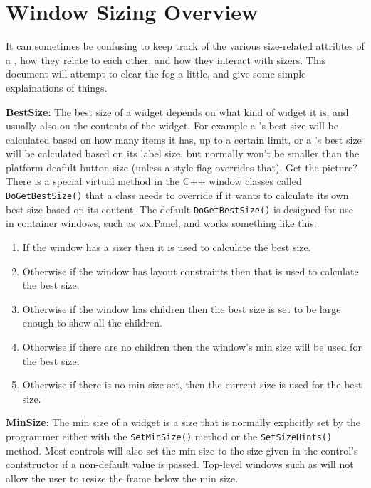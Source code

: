 \section{Window Sizing Overview}\label{windowsizingoverview}




It can sometimes be confusing to keep track of the various
size-related attribtes of a , how they
relate to each other, and how they interact with sizers. This document
will attempt to clear the fog a little, and give some simple
explainations of things.

{\bf BestSize}: The best size of a widget depends on what kind of widget it
is, and usually also on the contents of the widget. For example a
's best size will be calculated based on
how many items it has, up to a certain limit, or a
's best size will be calculated based on
its label size, but normally won't be smaller than the platform
deafult button size (unless a style flag overrides that). Get the
picture? There is a special virtual method in the C++ window classes
called \texttt{DoGetBestSize()} that a class needs to override if it
wants to calculate its own best size based on its content. The default
\texttt{DoGetBestSize()} is designed for use in container windows,
such as wx.Panel, and works something like this:

\begin{enumerate}
  \item{If the window has a sizer then it is used to calculate the best size.}
  \item{Otherwise if the window has layout constraints then that is used to calculate the best size.}
  \item{Otherwise if the window has children then the best size is set to be large enough to show all the children.}
  \item{Otherwise if there are no children then the window's min size will be used for the best size.}
  \item{Otherwise if there is no min size set, then the current size is used for the best size.}
\end{enumerate}

{\bf MinSize}: The min size of a widget is a size that is normally
explicitly set by the programmer either with the \texttt{SetMinSize()}
method or the \texttt{SetSizeHints()} method. Most controls will also
set the min size to the size given in the control's contstructor if a
non-default value is passed. Top-level windows such as
 will not allow the user to resize the frame
below the min size.

